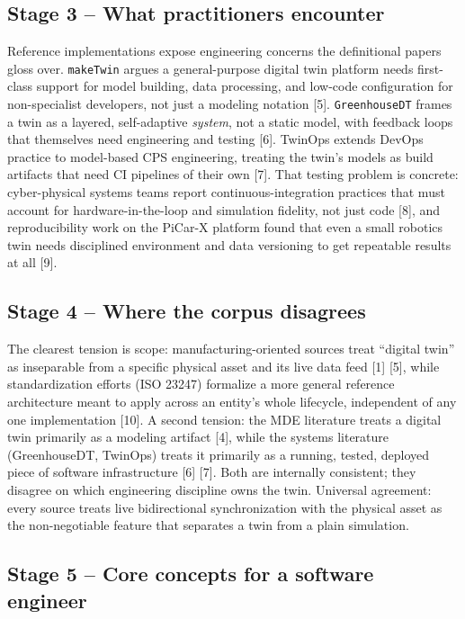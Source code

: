 \documentclass[
  12pt,
  a4paper,
]{article}
\begin{document}
\subsection{Stage 3 -- What practitioners
encounter}\label{stage-3-what-practitioners-encounter}

Reference implementations expose engineering concerns the definitional
papers gloss over. \texttt{makeTwin} argues a general-purpose digital
twin platform needs first-class support for model building, data
processing, and low-code configuration for non-specialist developers,
not just a modeling notation {[}5{]}. \texttt{GreenhouseDT} frames a
twin as a layered, self-adaptive \emph{system}, not a static model, with
feedback loops that themselves need engineering and testing {[}6{]}.
TwinOps extends DevOps practice to model-based CPS engineering, treating
the twin's models as build artifacts that need CI pipelines of their own
{[}7{]}. That testing problem is concrete: cyber-physical systems teams
report continuous-integration practices that must account for
hardware-in-the-loop and simulation fidelity, not just code {[}8{]}, and
reproducibility work on the PiCar-X platform found that even a small
robotics twin needs disciplined environment and data versioning to get
repeatable results at all {[}9{]}.

\subsection{Stage 4 -- Where the corpus
disagrees}\label{stage-4-where-the-corpus-disagrees}

The clearest tension is scope: manufacturing-oriented sources treat
``digital twin'' as inseparable from a specific physical asset and its
live data feed {[}1{]} {[}5{]}, while standardization efforts (ISO
23247) formalize a more general reference architecture meant to apply
across an entity's whole lifecycle, independent of any one
implementation {[}10{]}. A second tension: the MDE literature treats a
digital twin primarily as a modeling artifact {[}4{]}, while the systems
literature (GreenhouseDT, TwinOps) treats it primarily as a running,
tested, deployed piece of software infrastructure {[}6{]} {[}7{]}. Both
are internally consistent; they disagree on which engineering discipline
owns the twin. Universal agreement: every source treats live
bidirectional synchronization with the physical asset as the
non-negotiable feature that separates a twin from a plain simulation.

\subsection{Stage 5 -- Core concepts for a software
engineer}\label{stage-5-core-concepts-for-a-software-engineer}
\end{document}
